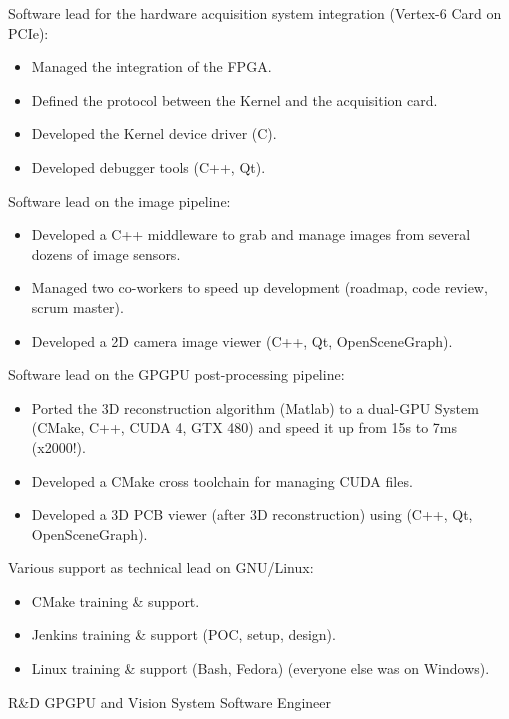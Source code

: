 \documentclass{article}
\begin{document}
\begin{llist}
{%
Software lead for the hardware acquisition system integration (Vertex-6 Card on PCIe):
\vspace{-0.33cm}
\begin{itemize}
	\item Managed the integration of the FPGA.
	\item Defined the protocol between the Kernel and the acquisition card.
	\item Developed the Kernel device driver (C).
	\item Developed debugger tools (C++, Qt).
\end{itemize}
Software lead on the image pipeline:
\vspace{-0.33cm}
\begin{itemize}
	\item Developed a C++ middleware to grab and manage images from several dozens of image sensors.
	\item Managed two co-workers to speed up development (roadmap, code review, scrum master).
	\item Developed a 2D camera image viewer (C++, Qt, OpenSceneGraph).
\end{itemize}
Software lead on the GPGPU post-processing pipeline:
\vspace{-0.33cm}
\begin{itemize}
	\item Ported the 3D reconstruction algorithm (Matlab) to a dual-GPU System (CMake, C++, CUDA 4, GTX 480)
		and speed it up from 15s to 7ms (x2000!).
	\item Developed a CMake cross toolchain for managing CUDA files.
	\item Developed a 3D PCB viewer (after 3D reconstruction) using (C++, Qt, OpenSceneGraph).
\end{itemize}

Various support as technical lead on GNU/Linux:
\vspace{-0.33cm}
\begin{itemize}
	\item CMake training \& support.
	\item Jenkins training \& support (POC, setup, design).
	\item Linux training \& support (Bash, Fedora) (everyone else was on Windows).
\end{itemize}
} {
R\&D GPGPU and Vision System Software Engineer\\
\vspace{-0.33cm}

}
\end{llist}
\end{document}
